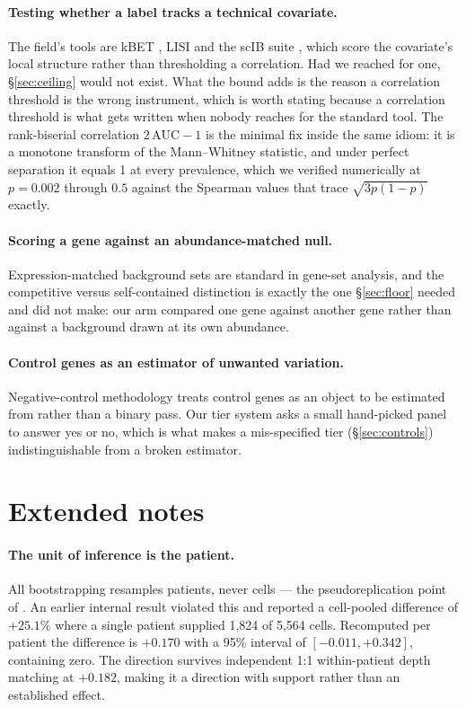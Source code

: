 \paragraph{Testing whether a label tracks a technical covariate.} The field's
tools are kBET \citep{buttner2019}, LISI \citep{korsunsky2019} and the scIB
suite \citep{luecken2022}, which score the covariate's local structure rather
than thresholding a correlation. Had we reached for one, \S\ref{sec:ceiling}
would not exist. What the bound adds is the reason a correlation threshold is the
wrong instrument, which is worth stating because a correlation threshold is what
gets written when nobody reaches for the standard tool. The rank-biserial
correlation $2\,\mathrm{AUC} - 1$ is the minimal fix inside the same idiom: it is
a monotone transform of the Mann--Whitney statistic, and under perfect separation
it equals 1 at every prevalence, which we verified numerically at
$p = 0.002$ through $0.5$ against the Spearman values that trace
$\sqrt{3p(1-p)}$ exactly.

\paragraph{Scoring a gene against an abundance-matched null.} Expression-matched
background sets are standard in gene-set analysis, and the competitive versus
self-contained distinction \citep{wu2012} is exactly the one \S\ref{sec:floor}
needed and did not make: our arm compared one gene against another gene rather
than against a background drawn at its own abundance.

\paragraph{Control genes as an estimator of unwanted variation.} Negative-control
methodology \citep{gagnonbartsch2012} treats control genes as an object to be
estimated from rather than a binary pass. Our tier system asks a small hand-picked
panel to answer yes or no, which is what makes a mis-specified tier
(\S\ref{sec:controls}) indistinguishable from a broken estimator.

\section{Extended notes}
\label{app:extended}

\paragraph{The unit of inference is the patient.} All bootstrapping resamples
patients, never cells --- the pseudoreplication point of \citet{squair2021}. An
earlier internal result violated this and reported a cell-pooled difference of
$+25.1\%$ where a single patient supplied 1{,}824 of 5{,}564 cells. Recomputed
per patient the difference is $+0.170$ with a 95\% interval of $[-0.011,
+0.342]$, containing zero. The direction survives independent 1:1
within-patient depth matching at $+0.182$, making it a direction with support
rather than an established effect.

